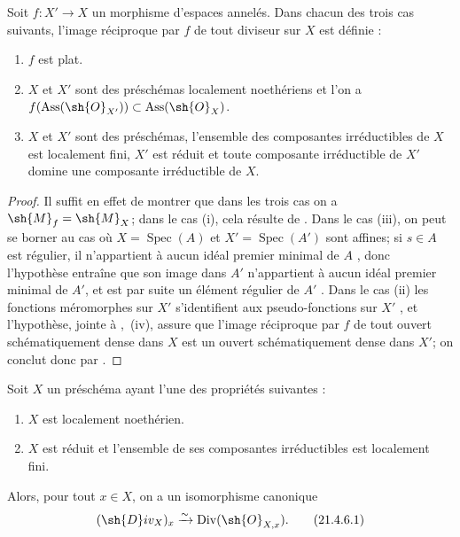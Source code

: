 \begin{proposition}[21.4.5]
\label{IV.21.4.5}
Soit $f:X'\to X$ un morphisme d'espaces annelés.
Dans chacun des trois cas suivants, l'image réciproque par $f$ de tout diviseur sur $X$ est définie :
\begin{enumerate}[label=(\roman*)]
  \item $f$ est plat.
  \item $X$ et $X'$ sont des préschémas localement noethériens et l'on a $f(\operatorname{Ass}(\sh{O}_{X'}))\subset\operatorname{Ass}(\sh{O}_X)$.
  \item $X$ et $X'$ sont des préschémas, l'ensemble des composantes irréductibles de $X$ est localement fini, $X'$ est réduit et toute composante irréductible de $X'$ domine une composante irréductible de $X$.
\end{enumerate}
\end{proposition}

\begin{proof}
Il suffit en effet de montrer que dans les trois cas on a $\sh{M}_f=\sh{M}_X$;
dans le cas (i), cela résulte de .
Dans le cas (iii), on peut se borner au cas où $X=\operatorname{Spec}(A)$ et $X'=\operatorname{Spec}(A')$ sont affines;
si $s\in A$ est régulier, il n'appartient à aucun idéal premier minimal de $A$ , donc l'hypothèse entraîne que son image dans $A'$ n'appartient à aucun idéal premier minimal de $A'$, et est par suite un élément régulier de $A'$ .
Dans le cas (ii) les fonctions méromorphes sur $X'$ s'identifient aux pseudo-fonctions sur $X'$ , et l'hypothèse, jointe à ,~(iv), assure que l'image réciproque
par $f$ de tout ouvert schématiquement dense dans $X$ est un ouvert schématiquement dense dans $X'$;
on conclut donc par .
\end{proof}

\begin{corollary}[21.4.6]
\label{IV.21.4.6}
Soit $X$ un préschéma ayant l'une des propriétés suivantes :
\begin{enumerate}[label=(\roman*)]
  \item $X$ est localement noethérien.
  \item $X$ est réduit et l'ensemble de ses composantes irréductibles est localement fini.
\end{enumerate}
Alors, pour tout $x\in X$, on a un isomorphisme canonique
\[
\label{IV.21.4.6.1}
  (\sh{D}iv_X)_x\xrightarrow{\sim}\operatorname{Div}(\sh{O}_{X,x}).
  \tag{21.4.6.1}
\]
\end{corollary}

